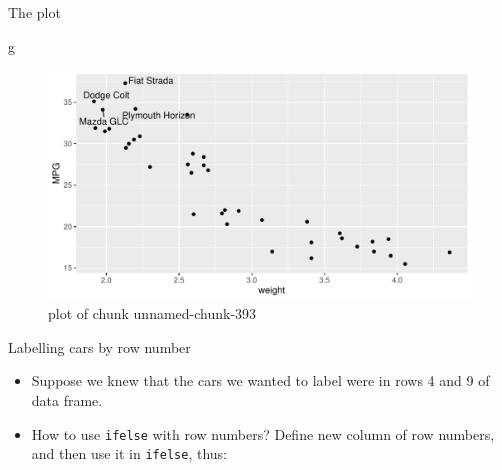 \documentclass[ignorenonframetext,]{beamer}
\newenvironment{Shaded}{\begin{snugshade}}{\end{snugshade}}
\newcommand{\DataTypeTok}[1]{\textcolor[rgb]{0.13,0.29,0.53}{#1}}
\newcommand{\DecValTok}[1]{\textcolor[rgb]{0.00,0.00,0.81}{#1}}
\newcommand{\KeywordTok}[1]{\textcolor[rgb]{0.13,0.29,0.53}{\textbf{#1}}}
\newcommand{\NormalTok}[1]{#1}
\newcommand{\OperatorTok}[1]{\textcolor[rgb]{0.81,0.36,0.00}{\textbf{#1}}}
\newcommand{\StringTok}[1]{\textcolor[rgb]{0.31,0.60,0.02}{#1}}
\providecommand{\tightlist}{%
  \setlength{\itemsep}{0pt}\setlength{\parskip}{0pt}}
\begin{document}
\begin{frame}[fragile]{The plot}
\protect\hypertarget{the-plot-5}{}

\begin{Shaded}
\begin{Highlighting}[]
\NormalTok{g}
\end{Highlighting}
\end{Shaded}

\begin{figure}
\centering
\includegraphics{figure/unnamed-chunk-393-1.pdf}
\caption{plot of chunk unnamed-chunk-393}
\end{figure}

\end{frame}

\begin{frame}[fragile]{Labelling cars by row number}
\protect\hypertarget{labelling-cars-by-row-number}{}

\begin{itemize}
\tightlist
\item
  Suppose we knew that the cars we wanted to label were in rows 4 and 9
  of data frame.
\item
  How to use \texttt{ifelse} with row numbers? Define new column of row
  numbers, and then use it in \texttt{ifelse}, thus:
\end{itemize}

\begin{Shaded}
\end{Shaded}

\end{frame}
\end{document}
